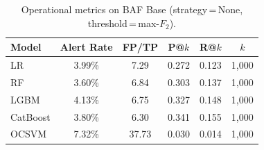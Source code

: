 \begin{table}[ht]
\centering
\caption{Operational metrics on BAF Base (strategy\,=\,None, threshold\,=\,max-$F_2$).}
\label{tab:ops_baf}
\begin{tabular}{l c c c c c}
\toprule
Model & Alert Rate & FP/TP & P@$k$ & R@$k$ & $k$ \\
\midrule
LR         & 3.99\% & 7.29 & 0.272 & 0.123 & 1,000 \\
RF         & 3.60\% & 6.84 & 0.303 & 0.137 & 1,000 \\
LGBM       & 4.13\% & 6.75 & 0.327 & 0.148 & 1,000 \\
CatBoost   & 3.80\% & 6.30 & 0.341 & 0.155 & 1,000 \\
OCSVM      & 7.32\% & 37.73 & 0.030 & 0.014 & 1,000 \\
\bottomrule
\end{tabular}
\end{table}